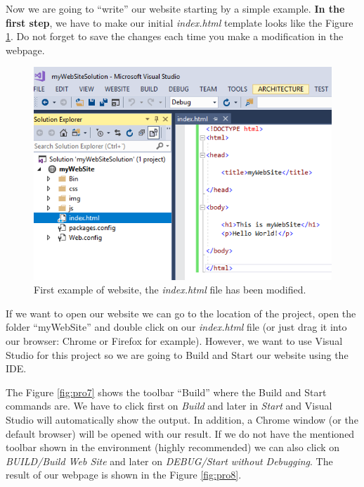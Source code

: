 Now we are going to ``write'' our website starting by a simple example. \textbf{In the first step}, we have to make our initial \textit{index.html} template looks like the Figure \ref{fig:pro6}. Do not forget to save the changes each time you make a modification in the webpage. 

\begin{figure}
    \centering
    \includegraphics[width= 0.9 \textwidth]{Figures/Projects/pro6}
    \caption{First example of website, the \textit{index.html} file has been modified.}
    \label{fig:pro6}
\end{figure}

If we want to open our website we can go to the location of the project, open the folder ``myWebSite'' and double click on our \textit{index.html} file (or just drag it into our browser: Chrome or Firefox for example). However, we want to use Visual Studio for this project so we are going to Build and Start our website using the IDE. 

The Figure \ref{fig:pro7} shows the toolbar ``Build'' where the Build and Start commands are. We have to click first on \textit{Build} and later in \textit{Start} and Visual Studio will automatically show the output. In addition, a Chrome window (or the default browser) will be opened with our result. If we do not have the mentioned toolbar shown in the environment (highly recommended) we can also click on \textit{BUILD/Build Web Site} and later on \textit{DEBUG/Start without Debugging}. The result of our webpage is shown in the Figure \ref{fig:pro8}.

